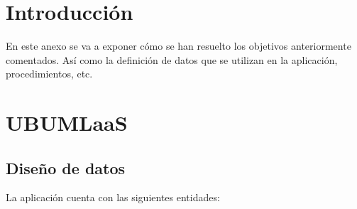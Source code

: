 
\section{Introducción}
En este anexo se va a exponer cómo se han resuelto los objetivos anteriormente comentados. Así como la definición de datos que se utilizan en la aplicación, procedimientos, etc. 

\section{UBUMLaaS}
\subsection{Diseño de datos}
La aplicación cuenta con las siguientes entidades:
